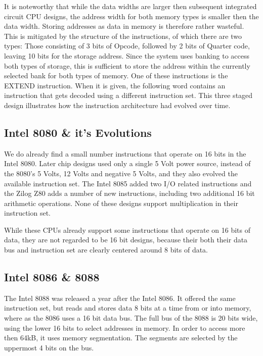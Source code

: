 \documentclass[twoside,twocolumn]{article}
\begin{document}
It is noteworthy that while the data widths are larger then subsequent integrated circuit
CPU designs, the address width for both memory types is smaller then the data width.
Storing addresses as data in memory is therefore rather wasteful. This is mitigated by
the structure of the instructions, of which there are two types: Those consisting of 3
bits of Opcode, followed by 2 bits of Quarter code, leaving 10 bits for the storage
address. Since the system uses banking to access both types of storage, this is
sufficient to store the address within the currently selected bank for both types of
memory. One of these instructions is the EXTEND instruction. When it is given, the
following word contains an instruction that gets decoded using a different instruction
set. This three staged design illustrates how the instruction architecture had evolved
over time.

\subsection{Intel 8080 \& it's Evolutions}

We do already find a small number instructions that operate on 16 bits in the Intel 8080.
Later chip designs used only a single 5 Volt power source, instead of the 8080's 5 Volts,
12 Volts and negative 5 Volts, and they also evolved the available instruction set. The
Intel 8085 added two I/O related instructions and the Zilog Z80 adds a number of new
instructions, including two additional 16 bit arithmetic operations. None of these designs
support multiplication in their instruction set. \cite{softwaresolutions}

While these CPUs already support some instructions that operate on 16 bits of data, they
are not regarded to be 16 bit designs, because their both their data bus and
instruction set are clearly centered around 8 bits of data.

\subsection{Intel 8086 \& 8088}

The Intel 8088 was released a year after the Intel 8086. It offered the same instruction
set, but reads and stores data 8 bits at a time from or into memory, where as the 8086
uses a 16 bit data bus. The full bus of the 8088 is 20 bits wide, using the lower 16 bits
to select addresses in memory. In order to access more then 64kB, it uses memory
segmentation. The segments are selected by the uppermost 4 bits on the bus.
\end{document}
